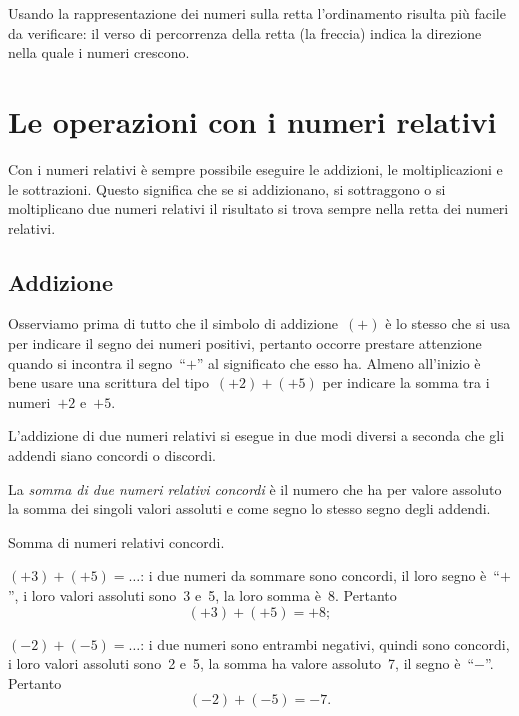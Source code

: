 Usando la rappresentazione dei numeri sulla retta l'ordinamento risulta più facile da verificare:
il verso di percorrenza della retta (la freccia) indica la direzione nella quale i numeri crescono.

\vspazio\ovalbox{\risolvii \ref{ese:2.1}, \ref{ese:2.2}, \ref{ese:2.3}, \ref{ese:2.4}}

\section{Le operazioni con i numeri relativi}

Con i numeri relativi è sempre possibile eseguire le addizioni, le moltiplicazioni e le sottrazioni.
Questo significa che se si addizionano, si sottraggono o si moltiplicano due numeri relativi il risultato si
trova sempre nella retta dei numeri relativi.

\subsection{Addizione}

Osserviamo prima di tutto che il simbolo di addizione~$(+)$ è lo stesso che si usa per indicare il segno dei numeri
positivi, pertanto occorre prestare attenzione quando si incontra il segno~``$+$'' al significato che esso ha.
Almeno all'inizio è bene usare una scrittura del tipo~$(+2)+(+5)$ per indicare la somma tra i numeri~$+2$ e~$+5$.

L'addizione di due numeri relativi si esegue in due modi diversi a seconda che gli addendi siano concordi o discordi.

La \emph{somma di due numeri relativi concordi} è il numero che ha per valore assoluto la somma dei singoli valori assoluti e
come segno lo stesso segno degli addendi.

\pagebreak
\begin{exrig}
 \begin{esempio} Somma di numeri relativi concordi.
  \begin{itemize*}
  \item $(+3)+(+5)=\ldots$: i due numeri da sommare sono concordi, il loro segno è~``$+$'', i loro valori assoluti sono~3 e~5,
  la loro somma è~8. Pertanto
  \[(+3)+(+5)=+8;\]
  \item $(-2)+(-5)=\ldots$: i due numeri sono entrambi negativi, quindi sono concordi, i loro valori assoluti sono~2 e~5,
  la somma ha valore assoluto~7, il segno è~``$-$''. Pertanto
  \[(-2)+(-5)=-7.\]
  \end{itemize*}
 \end{esempio}
\end{exrig}
	

